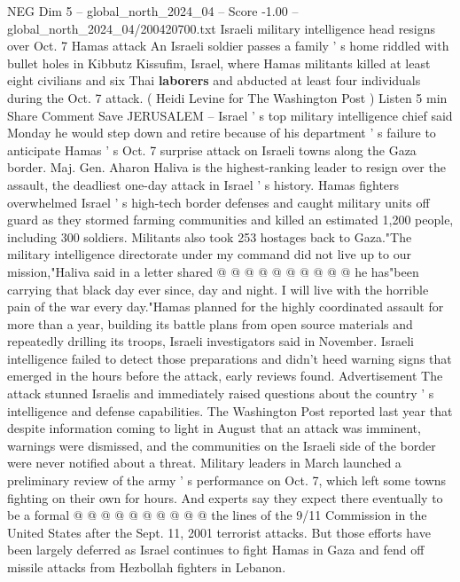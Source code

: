 \begin{textsample}{NEG Dim 5 – global\_north\_2024\_04 – Score -1.00 – global\_north\_2024\_04/200420700.txt}  \label{ex:f5_neg_191}
Israeli military intelligence head resigns over Oct. 7 Hamas attack An Israeli soldier passes a family ' s home riddled with bullet holes in Kibbutz Kissufim, Israel, where Hamas militants killed at least eight civilians and six Thai \textbf{laborers} and abducted at least four individuals during the Oct. 7 attack. ( Heidi Levine for The Washington Post ) Listen 5 min Share Comment Save JERUSALEM -- Israel ' s top military intelligence chief said Monday he would step down and retire because of his department ' s failure to anticipate Hamas ' s Oct. 7 surprise attack on Israeli towns along the Gaza border.
Maj.
Gen.
Aharon Haliva is the highest-ranking leader to resign over the assault, the deadliest one-day attack in Israel ' s history.
Hamas fighters overwhelmed Israel ' s high-tech border defenses and caught military units off guard as they stormed farming communities and killed an estimated 1,200 people, including 300 soldiers.
Militants also took 253 hostages back to Gaza."The military intelligence directorate under my command did not live up to our mission,"Haliva said in a letter shared @ @ @ @ @ @ @ @ @ @ he has"been carrying that black day ever since, day and night.
I will live with the horrible pain of the war every day."Hamas planned for the highly coordinated assault for more than a year, building its battle plans from open source materials and repeatedly drilling its troops, Israeli investigators said in November.
Israeli intelligence failed to detect those preparations and didn't heed warning signs that emerged in the hours before the attack, early reviews found.
Advertisement The attack stunned Israelis and immediately raised questions about the country ' s intelligence and defense capabilities.
The Washington Post reported last year that despite information coming to light in August that an attack was imminent, warnings were dismissed, and the communities on the Israeli side of the border were never notified about a threat.
Military leaders in March launched a preliminary review of the army ' s performance on Oct. 7, which left some towns fighting on their own for hours.
And experts say they expect there eventually to be a formal @ @ @ @ @ @ @ @ @ @ the lines of the 9/11 Commission in the United States after the Sept. 11, 2001 terrorist attacks.
But those efforts have been largely deferred as Israel continues to fight Hamas in Gaza and fend off missile attacks from Hezbollah fighters in Lebanon.

\end{textsample}
